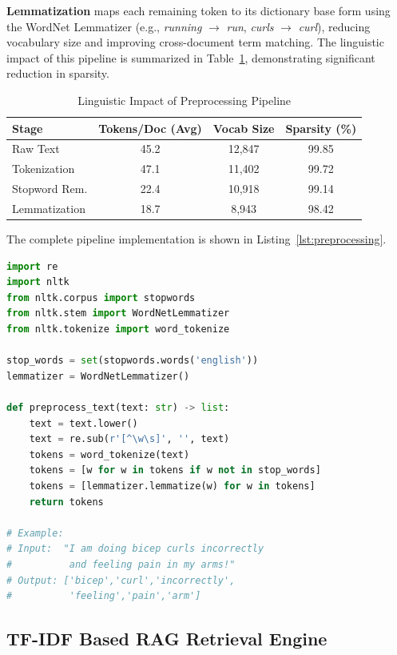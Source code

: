 \documentclass[conference]{IEEEtran}
\begin{document}
\textbf{Lemmatization} maps each remaining token to its dictionary base form using the WordNet Lemmatizer (e.g., \textit{running} $\rightarrow$ \textit{run}, \textit{curls} $\rightarrow$ \textit{curl}), reducing vocabulary size and improving cross-document term matching. The linguistic impact of this pipeline is summarized in Table~\ref{tab:nlp_impact}, demonstrating significant reduction in sparsity.

\begin{table}[htbp]
\caption{Linguistic Impact of Preprocessing Pipeline}
\label{tab:nlp_impact}
\centering
\begin{tabular}{lccc}
\toprule
\textbf{Stage} & \textbf{Tokens/Doc (Avg)} & \textbf{Vocab Size} & \textbf{Sparsity (\%)} \\
\midrule
Raw Text       & 45.2 & 12,847 & 99.85 \\
Tokenization   & 47.1 & 11,402 & 99.72 \\
Stopword Rem.  & 22.4 & 10,918 & 99.14 \\
Lemmatization  & 18.7 & 8,943  & 98.42 \\
\bottomrule
\end{tabular}
\end{table}

The complete pipeline implementation is shown in Listing~\ref{lst:preprocessing}.

\begin{lstlisting}[language=Python, caption={NLP Preprocessing Pipeline Implementation}, label={lst:preprocessing}]
import re
import nltk
from nltk.corpus import stopwords
from nltk.stem import WordNetLemmatizer
from nltk.tokenize import word_tokenize

stop_words = set(stopwords.words('english'))
lemmatizer = WordNetLemmatizer()

def preprocess_text(text: str) -> list:
    text = text.lower()
    text = re.sub(r'[^\w\s]', '', text)
    tokens = word_tokenize(text)
    tokens = [w for w in tokens if w not in stop_words]
    tokens = [lemmatizer.lemmatize(w) for w in tokens]
    return tokens

# Example:
# Input:  "I am doing bicep curls incorrectly
#          and feeling pain in my arms!"
# Output: ['bicep','curl','incorrectly',
#          'feeling','pain','arm']
\end{lstlisting}

\subsection{TF-IDF Based RAG Retrieval Engine}
\end{document}
